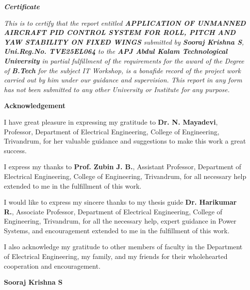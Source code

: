 \documentclass[a4paper,12pt,oneside]{report}
\begin{document}
\begin{center}  \textbf{{\large \textit {Certificate}}}\vspace{.1cm}\end{center}

 \textit {This  is  to  certify  that  the report entitled \textbf {APPLICATION OF UNMANNED AIRCRAFT PID CONTROL SYSTEM FOR ROLL, PITCH AND YAW STABILITY ON FIXED WINGS } submitted  by \textbf{Sooraj Krishna S}, \textbf{Uni.Reg.No. TVE25EL064} to the \textbf{APJ Abdul Kalam Technological University} in partial fulfillment of the requirements  for  the  award  of the Degree of \textbf{B.Tech} for the subject IT Workshop, is a bonafide record of the project work carried out by him under our guidance  and  supervision. This  report in  any  form    has  not  been  submitted  to  any  other University or Institute for any purpose.}


\newpage
\thispagestyle{empty}
\begin{center}  {\Large \bf Acknowledgement}\end{center}
\noindent 
\par 
I have great pleasure in expressing my gratitude to \textbf{Dr. N. Mayadevi}, Professor, Department of Electrical Engineering, College of Engineering, Trivandrum, for her valuable guidance and suggestions to make this work a great success.
\par
I express my thanks to \textbf{Prof. Zubin J. B.}, Assistant Professor, Department of Electrical Engineering, College of Engineering, Trivandrum, for all necessary help extended to me in the fulfillment of this work.
\par
I would like to express my sincere thanks to my thesis guide \textbf{Dr. Harikumar R.}, Associate Professor, Department of Electrical Engineering, College of Engineering, Trivandrum, for all the necessary help, expert guidance in Power Systems, and encouragement extended to me in the fulfillment of this work.
\par
I also acknowledge my gratitude to other members of faculty in the Department of Electrical Engineering, my family, and my friends for their wholehearted cooperation and encouragement.
\par
\vspace*{1cm}
\hspace{9cm} \textbf{Sooraj Krishna S}

\newpage
{}
\end{document}
